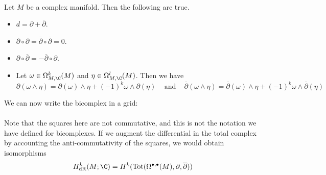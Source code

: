\documentclass[a4paper]{article}
\begin{document}
\begin{prp}{}{}\\
Let $M$ be a complex manifold. Then the following are true. 
\begin{itemize}
\item $d=\partial+\overline{\partial}$. 
\item $\partial\circ\partial=\overline{\partial}\circ\overline{\partial}=0$. 
\item $\partial\circ\overline{\partial}=-\overline{\partial}\circ\partial$. 
\item Let $\omega\in\Omega_{M,\C}^k(M)$ and $\eta\in\Omega_{M,\C}^l(M)$. Then we have $$\partial(\omega\wedge\eta)=\partial(\omega)\wedge\eta+(-1)^k\omega\wedge\partial(\eta)\;\;\;\text{ and }\;\;\;\overline{\partial}(\omega\wedge\eta)=\overline{\partial}(\omega)\wedge\eta+(-1)^k\omega\wedge\overline{\partial}(\eta)$$
\end{itemize}
\end{prp}

We can now write the bicomplex in a grid: \\
\\
Note that the squares here are not commutative, and this is not the notation we have defined for bicomplexes. If we augment the differential in the total complex by accounting the anti-commutativity of the squares, we would obtain isomorphisms $$H_\text{dR}^k(M;\C)=H^k(\text{Tot}(\Omega^{\bullet,\bullet}(M),\partial,\overline{\partial}))$$
\end{document}
